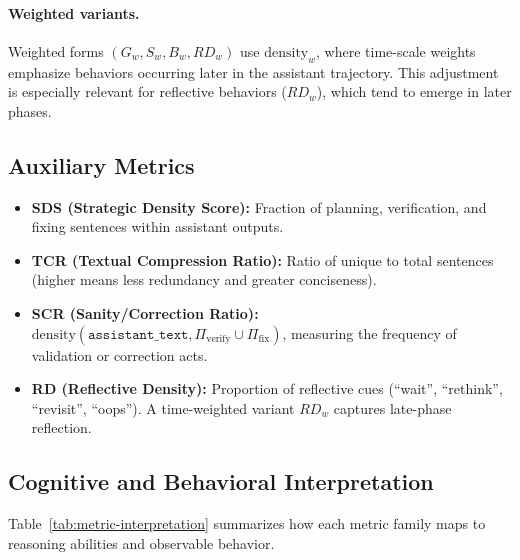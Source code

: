 \documentclass[11pt]{article}
\newcommand{\density}{\mathrm{density}}
\newcommand{\densityw}{\mathrm{density}_{w}}
\newcommand{\verify}{\Pi_{\text{verify}}}
\newcommand{\fix}{\Pi_{\text{fix}}}
\begin{document}
\paragraph{Weighted variants.}
Weighted forms $(G_w, S_w, B_w, RD_w)$ use $\densityw$, where time-scale weights
emphasize behaviors occurring later in the assistant trajectory. This adjustment is especially relevant for reflective behaviors ($RD_w$), which tend to emerge in later phases.

\subsection{Auxiliary Metrics}
\begin{itemize}
\item \textbf{SDS (Strategic Density Score):} Fraction of planning, verification, and fixing sentences within assistant outputs.
\item \textbf{TCR (Textual Compression Ratio):} Ratio of unique to total sentences (higher means less redundancy and greater conciseness).
\item \textbf{SCR (Sanity/Correction Ratio):} $\density(\texttt{assistant\_text}, \verify \cup \fix)$, measuring the frequency of validation or correction acts.
\item \textbf{RD (Reflective Density):} Proportion of reflective cues (``wait'', ``rethink'', ``revisit'', ``oops''). A time-weighted variant $RD_w$ captures late-phase reflection.
\end{itemize}

\subsection{Cognitive and Behavioral Interpretation}
Table~\ref{tab:metric-interpretation} summarizes how each metric family maps to reasoning abilities and observable behavior.
\end{document}
